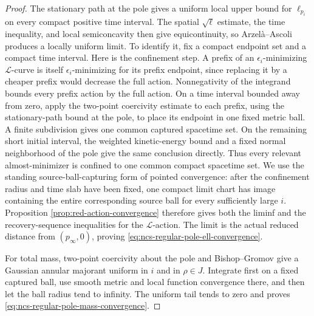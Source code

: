 \documentclass[10pt]{coll-l}
\theoremstyle{definition}
\theoremstyle{remark}
\numberwithin{section}{chapter}
\numberwithin{equation}{chapter}
\begin{document}
\begin{proof}
The stationary path at the pole gives a uniform local upper bound for
$\ell_{p_i}$ on every compact positive time interval.  The spatial
$\sqrt\ell$ estimate, the time inequality, and local semiconcavity then
give equicontinuity, so Arzel\`a--Ascoli produces a locally uniform limit.
To identify it, fix a compact endpoint set and a compact time interval.
Here is the confinement step.  A prefix of an $\epsilon_i$-minimizing
$\mathcal L$-curve is itself $\epsilon_i$-minimizing for its prefix
endpoint, since replacing it by a cheaper prefix would decrease the full
action.  Nonnegativity of the integrand bounds every prefix action by the
full action.  On a time interval bounded away from zero, apply the
two-point coercivity estimate to each prefix, using the stationary-path
bound at the pole, to place its endpoint in one fixed metric ball.  A
finite subdivision gives one common captured spacetime set.  On the
remaining short initial interval, the weighted kinetic-energy bound and a
fixed normal neighborhood of the pole give the same conclusion directly.
Thus every relevant almost-minimizer is confined to one common compact
spacetime set.  We use the standing source-ball-capturing form of pointed
convergence: after the confinement radius and time slab have been fixed,
one compact limit chart has image containing the entire corresponding
source ball for every sufficiently large $i$.  Proposition
\ref{prop:red-action-convergence} therefore gives both the liminf and the
recovery-sequence inequalities for the $\mathcal L$-action.  The limit is
the actual reduced distance from $(p_\infty,0)$, proving
\eqref{eq:ncs-regular-pole-ell-convergence}.

For total mass, two-point coercivity about the pole and Bishop--Gromov give
a Gaussian annular majorant uniform in $i$ and in $\rho\in J$.  Integrate
first on a fixed captured ball, use smooth metric and local function
convergence there, and then let the ball radius tend to infinity.  The
uniform tail tends to zero and proves
\eqref{eq:ncs-regular-pole-mass-convergence}.
\end{proof}
\end{document}
